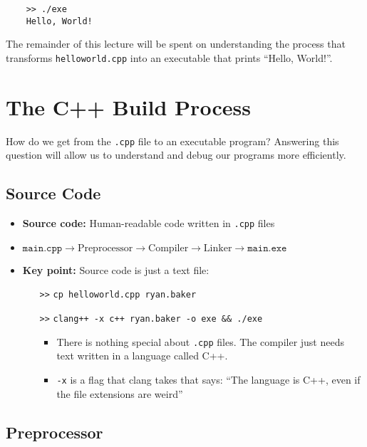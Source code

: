 \documentclass{article}
\begin{document}
\begin{verbatim}
	>> ./exe
	Hello, World!
\end{verbatim}

\noindent
The remainder of this lecture will be spent on understanding the process that transforms \texttt{helloworld.cpp} into an executable that prints ``Hello, World!''.

\section{The C++ Build Process}

\noindent
How do we get from the \texttt{.cpp} file to an executable program? Answering this question will allow us to understand and debug our programs more efficiently.

\subsection{Source Code}

\begin{itemize}
	\item \textbf{Source code:} Human-readable code written in \texttt{.cpp} files
	\item $\texttt{main.cpp}\rightarrow\boxed{\textrm{Preprocessor}}\rightarrow\boxed{\textrm{Compiler}}\rightarrow\boxed{\textrm{Linker}}\rightarrow\texttt{main.exe}$
	\item \textbf{Key point:} Source code is just a text file: \begin{itemize}
		\item[\texttt{>>}] \texttt{cp helloworld.cpp ryan.baker}
		\item[\texttt{>>}] \texttt{clang++ -x c++ ryan.baker -o exe \&\& ./exe}
		\begin{itemize}
			\item There is nothing special about \texttt{.cpp} files. The compiler just needs text written in a language called C++.
			\item \texttt{-x} is a flag that clang takes that says: ``The language is C++, even if the file extensions are weird''
		\end{itemize}
	\end{itemize}
\end{itemize}

\subsection{Preprocessor}
\end{document}
